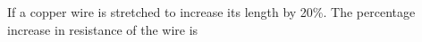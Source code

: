 \item If a copper wire is stretched to increase its length by 20\%. The percentage increase in resistance of the wire is \underline{\hspace{2.5cm}}%